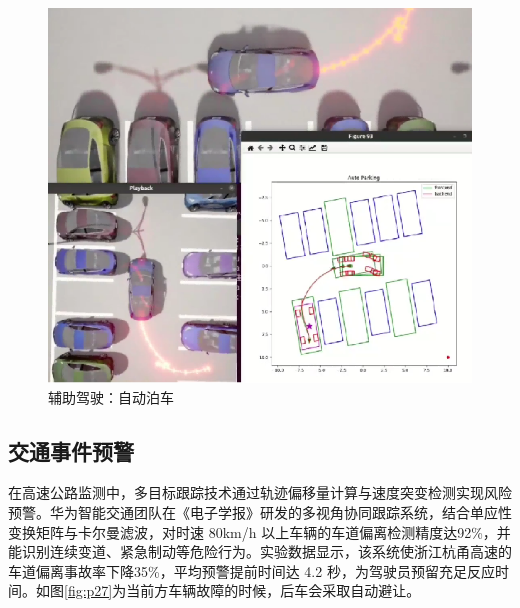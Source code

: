 \begin{figure}[htbp] %
	\centering
	\includegraphics[width=1\textwidth]{p28} %
	\caption{辅助驾驶：自动泊车} %
	\label{fig:p28} %
\end{figure}




\subsection{交通事件预警}

在高速公路监测中，多目标跟踪技术通过轨迹偏移量计算与速度突变检测实现风险预警。华为智能交通团队在《电子学报》\cite{huawei2020highway}研发的多视角协同跟踪系统，结合单应性变换矩阵与卡尔曼滤波，对时速 80km/h 以上车辆的车道偏离检测精度达92\%，并能识别连续变道、紧急制动等危险行为。实验数据显示，该系统使浙江杭甬高速的车道偏离事故率下降35\%，平均预警提前时间达 4.2 秒，为驾驶员预留充足反应时间。如图\ref{fig:p27}为当前方车辆故障的时候，后车会采取自动避让。



